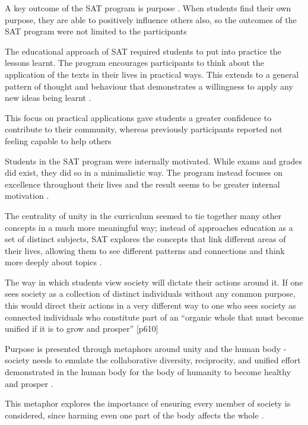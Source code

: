 A key outcome of the SAT program is purpose \citep{Honeyman2010}. When students find their own purpose, they are able to positively influence others also, so the outcomes of the SAT program were not limited to the participants \citep{Honeyman2010}

The educational approach of SAT required students to put into practice the lessons learnt. The program encourages participants to think about the application of the texts in their lives in practical ways. This extends to a general pattern of thought and behaviour that demonstrates a willingness to apply any new ideas being learnt \citep{Honeyman2010}.

This focus on practical applications gave students a greater confidence to contribute to their community, whereas previously participants reported not feeling capable to help others \citep{Honeyman2010}

Students in the SAT program were internally motivated. While exams and grades did exist, they did so in a minimalistic way. The program instead focuses on excellence throughout their lives and the result seems to be greater internal motivation \citep{Honeyman2010}.

The centrality of unity in the curriculum seemed to tie together many other concepts in a much more meaningful way; instead of approaches education as a set of distinct subjects, SAT explores the concepts that link different areas of their lives, allowing them to see different patterns and connections and think more deeply about topics \citep{Honeyman2010}. %

The way in which students view society will dictate their actions around it. If one sees society as a collection of distinct individuals without any common purpose, this would direct their actions in a very different way to one who sees society as connected individuals who constitute part of an “organic whole that must become unified if it is to grow and prosper” \citep{Honeyman2010}[p610]

Purpose is presented through metaphors around unity and the human body - society needs to emulate the collaborative diversity, reciprocity, and unified effort demonstrated in the human body for the body of humanity to become healthy and prosper \citep{Honeyman2010}.

This metaphor explores the importance of ensuring every member of society is considered, since harming even one part of the body affects the whole \citep{Honeyman2010}.

